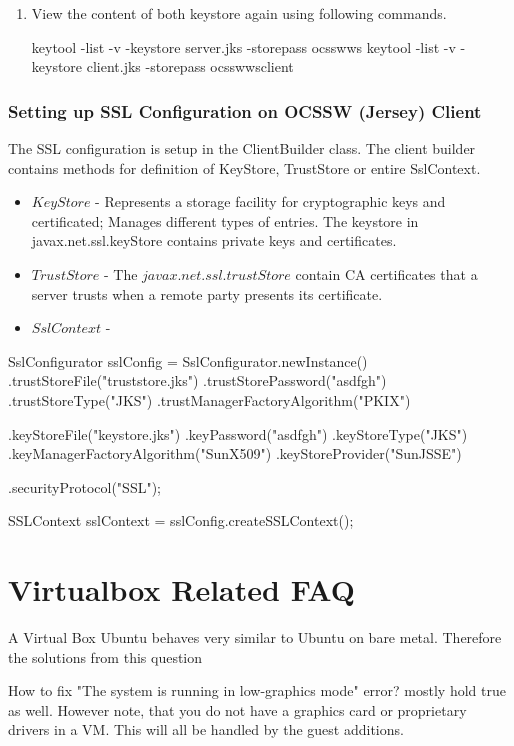 \documentclass[11pt, oneside]{article}   	%
\begin{document}
\begin{enumerate}
\item View the content of both keystore again using following commands.
\begin{code}
keytool -list -v -keystore server.jks -storepass ocsswws
keytool -list -v -keystore client.jks -storepass ocsswwsclient
\end{code}

\end{enumerate}

\subsubsection{\color{DeepPink4}Setting up SSL Configuration on OCSSW (Jersey) Client}
The SSL configuration is setup in the ClientBuilder class. The client builder contains methods for definition of KeyStore, TrustStore or entire SslContext.
\begin{itemize}
\item $KeyStore$ - Represents a storage facility for cryptographic keys and certificated; Manages different types of entries. The keystore in javax.net.ssl.keyStore contains  private keys and certificates.
\item $TrustStore$ -  The $javax.net.ssl.trustStore$ contain CA certificates that a server trusts when a remote party presents its certificate.
\item $SslContext$ -
\end{itemize}
\begin{code}
SslConfigurator sslConfig = SslConfigurator.newInstance()
    .trustStoreFile("truststore.jks")
    .trustStorePassword("asdfgh")
    .trustStoreType("JKS")
    .trustManagerFactoryAlgorithm("PKIX")

    .keyStoreFile("keystore.jks")
    .keyPassword("asdfgh")
    .keyStoreType("JKS")
    .keyManagerFactoryAlgorithm("SunX509")
    .keyStoreProvider("SunJSSE")

    .securityProtocol("SSL");

 SSLContext sslContext = sslConfig.createSSLContext();
\end{code}


\section{Virtualbox Related FAQ}
A Virtual Box Ubuntu behaves very similar to Ubuntu on bare metal. Therefore the solutions from this question

How to fix "The system is running in low-graphics mode" error?
mostly hold true as well. However note, that you do not have a graphics card or proprietary drivers in a VM. This will all be handled by the guest additions.
\end{document}

